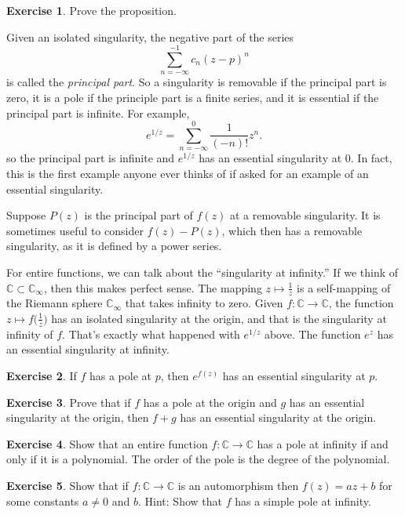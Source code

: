 \documentclass[12pt,openany]{book}
\newcommand{\C}{{\mathbb{C}}}
\newcommand{\myindex}[1]{#1\index{#1}}
\theoremstyle{plain}
\theoremstyle{remark}
\theoremstyle{definition}
\newenvironment{exbox}{%
    \def\FrameCommand{\vrule width 1pt \relax\hspace{10pt}}%
    \MakeFramed{\advance\hsize-\width\FrameRestore}%
}{%
    \endMakeFramed
}
\theoremstyle{exercise}
\newtheorem{exercise}{Exercise}[section]
\theoremstyle{example}
\begin{document}
\begin{exbox}
\begin{exercise}
Prove the proposition.
\end{exercise}
\end{exbox}

Given an isolated singularity, the negative part of the series
\begin{equation*}
\sum_{n=-\infty}^{-1} c_n {(z-p)}^n 
\end{equation*}
is called the \emph{\myindex{principal part}}.  So a singularity is
removable if the principal part is zero, it is a pole if the principle part
is a finite series, and it is essential if the principal part is infinite.
For example,
\begin{equation*}
e^{1/z}
=
\sum_{n=-\infty}^0 \frac{1}{(-n)!} z^n .
\end{equation*}
so the principal part is infinite and $e^{1/z}$ has an essential
singularity at $0$.  In fact, this is the first example anyone ever thinks of
if asked for an example of an essential singularity.

Suppose $P(z)$ is the principal part of $f(z)$ at a removable singularity.
It is sometimes useful to consider $f(z)-P(z)$, which then has a removable
singularity, as it is defined by a power series.

\medskip

For entire functions, we can talk about the ``singularity at infinity.''
If we think of $\C \subset \C_\infty$, then this makes perfect sense.
The mapping $z \mapsto \frac{1}{z}$ is a self-mapping of the Riemann
sphere $\C_\infty$ that takes infinity to zero.  Given $f \colon \C \to
\C$, the function $z \mapsto f\bigl( \frac{1}{z} \bigr)$ has an isolated
singularity at the origin, and that is the singularity at infinity
of $f$.  That's exactly what happened with $e^{1/z}$ above.  The function
$e^z$ has an essential singularity at infinity.

\begin{exbox}
\begin{exercise}
If $f$ has a pole at $p$, then $e^{f(z)}$ has an essential singularity at
$p$.
\end{exercise}

\begin{exercise}
Prove that if $f$ has a pole at the origin and $g$ has an essential
singularity at the origin, then $f+g$ has an essential singularity at the
origin.
\end{exercise}

\begin{exercise}
Show that an entire function $f \colon \C \to \C$ has a pole at infinity
if and only if it is a polynomial.  The order of the pole is the degree of
the polynomial.
\end{exercise}

\begin{exercise}
Show that if $f \colon \C \to \C$ is an automorphism then
$f(z) = az + b$ for
some constants $a \not= 0$ and $b$.  Hint: Show that $f$ has a simple pole at
infinity.
\end{exercise}
\end{exbox}
\end{document}
